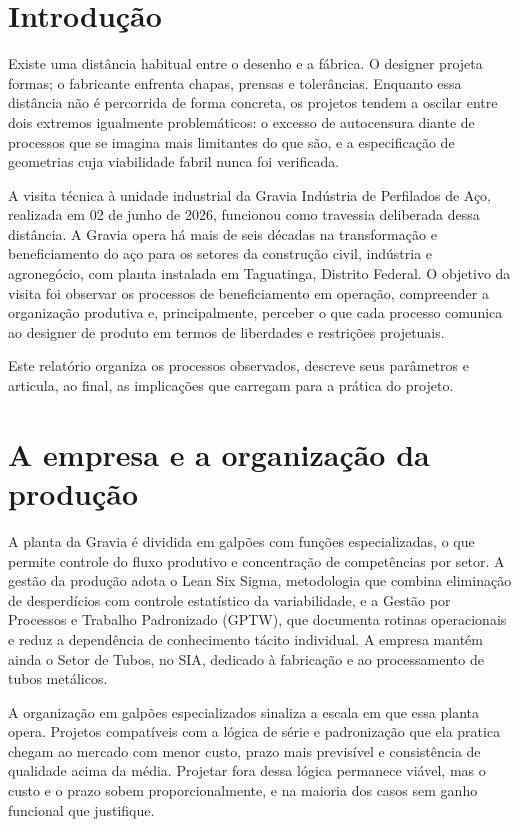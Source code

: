 \documentclass[
  12pt,
  a4paper,
  oneside,
  brazil,
  chapter=TITLE
]{article}
\newcommand{\secbreak}{\clearpage}
\let\oldsection\section
\renewcommand{\section}{\secbreak\oldsection}
\begin{document}
\section{Introdução}

Existe uma distância habitual entre o desenho e a fábrica. O designer projeta formas; o fabricante enfrenta chapas, prensas e tolerâncias. Enquanto essa distância não é percorrida de forma concreta, os projetos tendem a oscilar entre dois extremos igualmente problemáticos: o excesso de autocensura diante de processos que se imagina mais limitantes do que são, e a especificação de geometrias cuja viabilidade fabril nunca foi verificada.

A visita técnica à unidade industrial da Gravia Indústria de Perfilados de Aço, realizada em 02 de junho de 2026, funcionou como travessia deliberada dessa distância. A Gravia opera há mais de seis décadas na transformação e beneficiamento do aço para os setores da construção civil, indústria e agronegócio, com planta instalada em Taguatinga, Distrito Federal. O objetivo da visita foi observar os processos de beneficiamento em operação, compreender a organização produtiva e, principalmente, perceber o que cada processo comunica ao designer de produto em termos de liberdades e restrições projetuais.

Este relatório organiza os processos observados, descreve seus parâmetros e articula, ao final, as implicações que carregam para a prática do projeto.

\section{A empresa e a organização da produção}

A planta da Gravia é dividida em galpões com funções especializadas, o que permite controle do fluxo produtivo e concentração de competências por setor. A gestão da produção adota o Lean Six Sigma, metodologia que combina eliminação de desperdícios com controle estatístico da variabilidade, e a Gestão por Processos e Trabalho Padronizado (GPTW), que documenta rotinas operacionais e reduz a dependência de conhecimento tácito individual. A empresa mantém ainda o Setor de Tubos, no SIA, dedicado à fabricação e ao processamento de tubos metálicos.

A organização em galpões especializados sinaliza a escala em que essa planta opera. Projetos compatíveis com a lógica de série e padronização que ela pratica chegam ao mercado com menor custo, prazo mais previsível e consistência de qualidade acima da média. Projetar fora dessa lógica permanece viável, mas o custo e o prazo sobem proporcionalmente, e na maioria dos casos sem ganho funcional que justifique.
\end{document}
